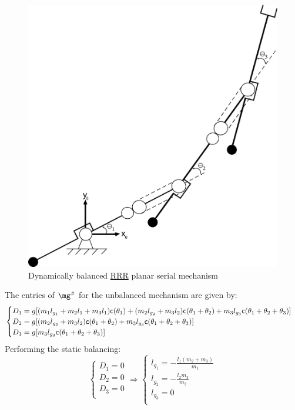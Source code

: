 \documentclass[a4paper,11pt,brazil,fleqn]{article}
\begin{document}
\begin{figure}[H]
	\centering
	\includegraphics[scale=0.09197]{RRR2D.jpg}  
	\caption{Dynamically balanced \underline{RRR} planar serial mechanism}
	\label{fig:RRR2D}
\end{figure}
The entries of $\mg\ssh$ for the unbalanced mechanism are given by:
\begin{equation}\label{eq:gh1}
\begin{cases}
D_1 = g[ (m_1 l_{g_1} + m_2 l_1 + m_3 l_1 ) \mathsf{c}(\theta_1) + (m_2 l_{g_2} + m_3 l_2) \mathsf{c}(\theta_1 + \theta_2) + m_3 l_{g_3} \mathsf{c}(\theta_1 + \theta_2 + \theta_3) ] \\
D_2 = g[  (m_2 l_{g_2} + m_3 l_2) \mathsf{c}(\theta_1 + \theta_2) + m_3 l_{g_3} \mathsf{c}(\theta_1 + \theta_2 + \theta_3) ] \\
D_3 = g[   m_3 l_{g_3} \mathsf{c}(\theta_1 + \theta_2 + \theta_3) ] \\
\end{cases}
\end{equation}
Performing the static balancing:
\begin{equation}\label{eq:StaticBalancing1}
\begin{cases}
D_1 = 0 \\
D_2 = 0 \\
D_3 = 0 \\
\end{cases}
\Rightarrow
\begin{cases}
l_{g_1} = -\frac{l_1(m_2 + m_3)}{m_1} \\
l_{g_2} = -\frac{l_2 m_3}{m_2} \\
l_{g_3} = 0 \\
\end{cases}
\end{equation}
\end{document}

